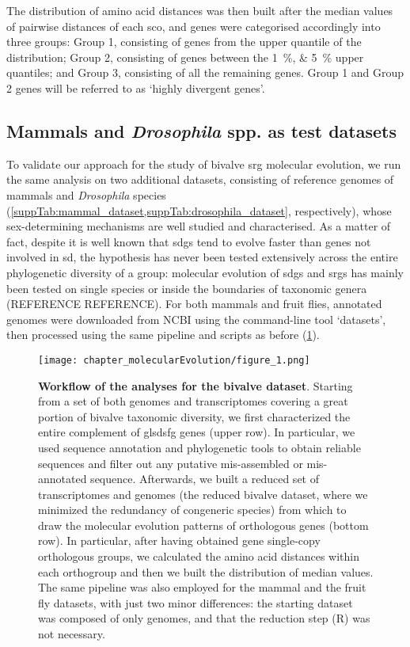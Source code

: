 The distribution of amino acid distances was then built after the median values of pairwise distances of each \gls{sco}, and genes were categorised accordingly into three groups: Group 1, consisting of genes from the \onepercent upper quantile of the distribution; Group 2, consisting of genes between the \qtylist{1;5}{\percent} upper quantiles; and Group 3, consisting of all the remaining genes. Group 1 and Group 2 genes will be referred to as ‘highly divergent genes’.

\subsection{Mammals and \textit{Drosophila} spp. as test datasets}
To validate our approach for the study of bivalve \gls{srg} molecular evolution, we run the same analysis on two additional datasets, consisting of reference genomes of mammals and \textit{Drosophila} species (\cref{suppTab:mammal_dataset,suppTab:drosophila_dataset}, respectively), whose sex-determining mechanisms are well studied and characterised. As a matter of fact, despite it is well known that \glspl{sdg} tend to evolve faster than genes not involved in \gls{sd}, the hypothesis has never been tested extensively across the entire phylogenetic diversity of a group: molecular evolution of \glspl{sdg} and \glspl{srg} has mainly been tested on single species or inside the boundaries of taxonomic genera (REFERENCE REFERENCE). For both mammals and fruit flies, annotated genomes were downloaded from NCBI using the command-line tool ‘datasets’, then processed using the same pipeline and scripts as before (\cref{fig:workflow}).

\begingroup
\captionsetup[figure]{format=hruleformat}
\begin{figure}[t!]
	\centering
	\texttt{[image: chapter\_molecularEvolution/figure\_1.png]}
	\caption[\textbf{Workflow of the analyses for the bivalve dataset}]
	{
		\textbf{Workflow of the analyses for the bivalve dataset}. Starting from a set of both genomes and transcriptomes covering a great portion of bivalve taxonomic diversity, we first characterized the entire complement of 	gls{dsfg} genes (upper row). In particular, we used sequence annotation and phylogenetic tools to obtain reliable sequences and filter out any putative mis-assembled or mis-annotated sequence. Afterwards, we built a reduced set of transcriptomes and genomes (the reduced bivalve dataset, where we minimized the redundancy of congeneric species) from which to draw the molecular evolution patterns of orthologous genes (bottom row). In particular, after having obtained gene single-copy orthologous groups, we calculated the amino acid distances within each orthogroup and then we built the distribution of median values. The same pipeline was also employed for the mammal and the fruit fly datasets, with just two minor differences: the starting dataset was composed of only genomes, and that the reduction step (R) was not necessary.
	}
	\label{fig:workflow}
\end{figure}
\endgroup

